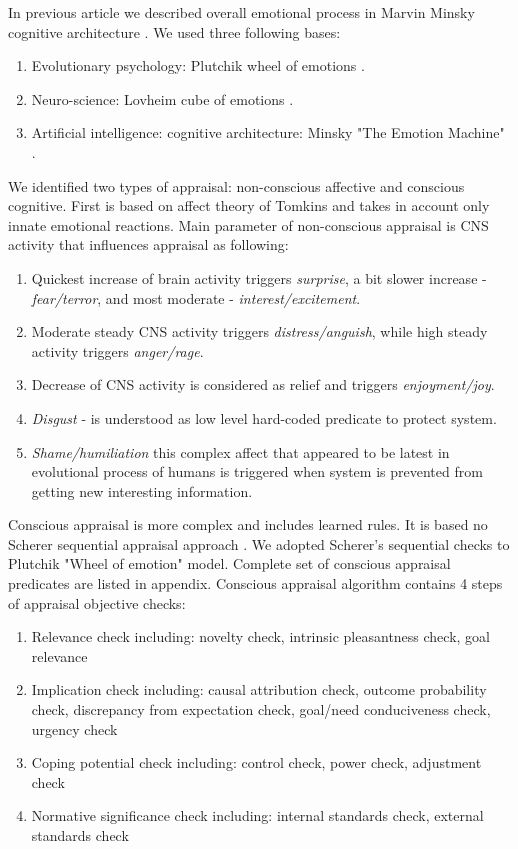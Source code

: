In previous article \cite{computational_emotional_thinking} we described overall emotional process in Marvin Minsky cognitive architecture \cite{emotionmachine}. We used three following bases:

\begin{enumerate}
	\item Evolutionary psychology: Plutchik wheel of emotions \cite{natureofemotions}.
	\item Neuro-science: Lovheim cube of emotions \cite{cubeofemotions}.
	\item Artificial intelligence: cognitive architecture: Minsky "The Emotion Machine" \cite{emotionmachine}.
\end{enumerate}


We identified two types of appraisal: non-conscious affective and conscious cognitive. First is based on affect theory of Tomkins \cite{primer_affect_psychology} and takes in account only innate emotional reactions. Main parameter of non-conscious appraisal is CNS activity that influences appraisal as following:

\begin{enumerate}
	\item Quickest increase of brain activity triggers \emph{surprise}, a bit slower increase - \emph{fear/terror}, and most moderate - \emph{interest/excitement}.
	\item Moderate steady CNS activity triggers \emph{distress/anguish}, while high steady activity triggers \emph{anger/rage}.
	\item Decrease of CNS activity is considered as relief and triggers \emph{enjoyment/joy}.
	\item \emph{Disgust} - is understood as low level hard-coded predicate to protect system.
	\item \emph{Shame/humiliation} this complex affect that appeared to be latest in evolutional process of humans is triggered when system is prevented from getting new interesting information.
\end{enumerate}

Conscious appraisal is more complex and includes learned rules. It is based no Scherer sequential appraisal approach \cite{appraisal_as_sequential_checking}. We adopted Scherer's sequential checks to Plutchik "Wheel of emotion" \cite{natureofemotions} model. Complete set of conscious appraisal predicates are listed in appendix. Conscious appraisal algorithm contains 4 steps of appraisal objective checks:

\begin{enumerate}
	\item  Relevance check including: novelty check, intrinsic pleasantness check, goal relevance
	\item  Implication check including: causal attribution check, outcome probability check, discrepancy from expectation check, goal/need conduciveness check, urgency check
	\item  Coping potential check including: control check, power check, adjustment check
	\item  Normative significance check including: internal standards check, external standards check
\end{enumerate}

